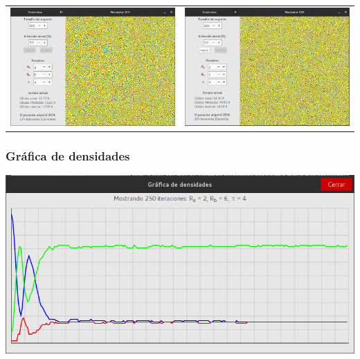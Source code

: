 \documentclass[12pt,letterpaper,oneside]{report}
\begin{document}
	\begin{center}
		\begin{tabular}{c c}
		\includegraphics[width=8cm]{img/resistencia/prueba/alta/3.png} & \includegraphics[width=8cm]{img/resistencia/prueba/alta/4.png} \\[1cm]
		\end{tabular}
	\end{center}

	\subsubsection{Gráfica de densidades}
	\begin{center}
		\includegraphics[width=14cm]{img/resistencia/prueba/alta/g.png}
	\end{center}
\end{document}
